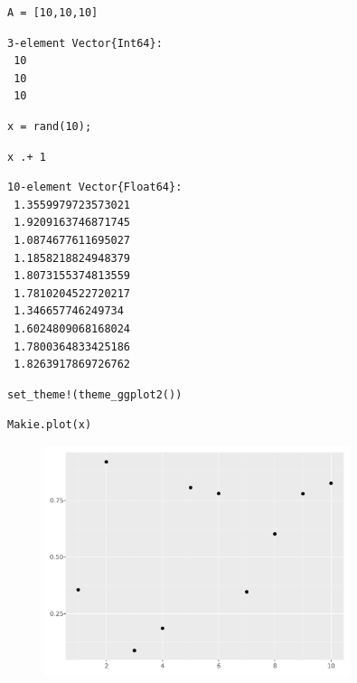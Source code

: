 \begin{lstlisting}[language=JuliaLocal, style=julia]
A = [10,10,10]
\end{lstlisting}

\begin{verbatim}
3-element Vector{Int64}:
 10
 10
 10
\end{verbatim}

\begin{lstlisting}[language=JuliaLocal, style=julia]
x = rand(10);
\end{lstlisting}

\begin{lstlisting}[language=JuliaLocal, style=julia]
x .+ 1
\end{lstlisting}

\begin{verbatim}
10-element Vector{Float64}:
 1.3559979723573021
 1.9209163746871745
 1.0874677611695027
 1.1858218824948379
 1.8073155374813559
 1.7810204522720217
 1.346657746249734
 1.6024809068168024
 1.7800364833425186
 1.8263917869726762
\end{verbatim}

\begin{lstlisting}[language=JuliaLocal, style=julia]
set_theme!(theme_ggplot2())
\end{lstlisting}

\begin{lstlisting}[language=JuliaLocal, style=julia]
Makie.plot(x)
\end{lstlisting}

\begin{figure}[H]
	\centering
	\includegraphics[width=0.8\textwidth]{./figures/examplepluto_figure2.pdf}
	\label{fig:examplepluto_figure2.pdf}

\end{figure}


